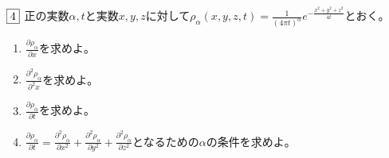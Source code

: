 \begin{tcolorbox} %
	$\fbox{4}$ 正の実数$\alpha, t$と実数$x, y, z$に対して$\rho_\alpha(x, y, z, t)= \frac{1}{(4\pi t)^\alpha}e^{-\frac{x^2+ y^2+ z^2}{4t}}$とおく。
\begin{enumerate}
	\item $\frac{\partial \rho_\alpha}{\partial x}$を求めよ。
	\item $\frac{\partial^2 \rho_\alpha}{\partial^2 x}$を求めよ。
	\item $\frac{\partial \rho_\alpha}{\partial t}$を求めよ。
	\item $\frac{\partial \rho_\alpha}{\partial t}= \frac{\partial^2 \rho_\alpha}{\partial x^2}+ \frac{\partial^2 \rho_\alpha}{\partial y^2}+ \frac{\partial^2 \rho_\alpha}{\partial z^2}$となるための$\alpha$の条件を求めよ。
\end{enumerate}
\end{tcolorbox}
